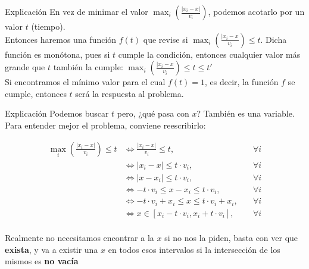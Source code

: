 \begin{frame}{Explicación}
	En vez de minimar el valor $\max_{i}(\frac{|x_{i} - x|}{v_{i}})$, podemos acotarlo por un valor $t$ (tiempo). \\

	Entonces haremos una función $f(t)$ que revise si $\max_{i}(\frac{|x_{i} - x }{v_{i}}) \leq t$. Dicha función es monótona, pues si $t$ cumple la condición, entonces cualquier valor más grande que $t$ también la cumple: $\max_{i}(\frac{|x_{i} - x}{v_{i}}) \leq t \leq t'$ \\

	Si encontramos el mínimo valor para el cual $f(t) = 1$, es decir, la función $f$ se cumple, entonces $t$ será la respuesta al problema.
\end{frame}

\begin{frame}{Explicación}
	Podemos buscar $t$ pero, ¿qué pasa con $x$? También es una variable. Para entender mejor el problema, conviene reescribirlo:

	\begin{align*}
		\max_{i} \left( \frac{|x_{i} - x|}{v_{i}} \right) \leq t & \iff \frac{|x_{i} - x|}{v_i} \leq t, \quad                           & \forall i \\
		                                                         & \iff |x_{i} - x| \leq t \cdot v_{i}, \quad                           & \forall i \\
		                                                         & \iff |x - x_{i}| \leq t \cdot v_{i}, \quad                           & \forall i \\
		                                                         & \iff -t \cdot v_{i} \leq x - x_{i} \leq t \cdot v_{i}, \quad         & \forall i \\
		                                                         & \iff -t \cdot v_{i} + x_{i} \leq x \leq t \cdot v_{i} + x_{i}, \quad & \forall i \\
		                                                         & \iff x \in [x_{i} - t \cdot v_{i}, x_{i} + t \cdot v_{i}], \quad     & \forall i \\
	\end{align*}

	Realmente no necesitamos encontrar a la $x$ si no nos la piden, basta con ver que \textbf{exista}, y va a existir una $x$ en todos esos intervalos si la intersección de los mismos es \textbf{no vacía}
\end{frame}


